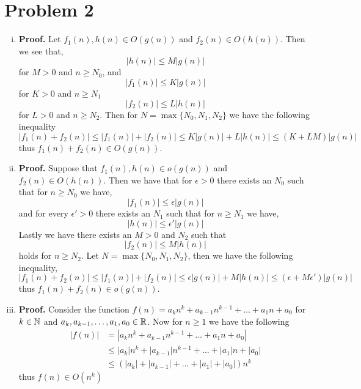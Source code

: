 \documentclass[12pt]{report}
\begin{document}
\section*{Problem 2}
\begin{enumerate}[(i)]
    \item \textbf{Proof.} Let $f_1(n), h(n) \in O(g(n))$ and $f_2(n) \in O(h(n))$. Then we see that,
    \begin{equation*}
        |h(n)| \leq M|g(n)|
    \end{equation*}
    for $M > 0$ and $n \geq N_0$, and
    \begin{equation*}
        |f_1(n)| \leq K|g(n)|
    \end{equation*}
    for $K > 0$ and $n \geq N_1$
    \begin{equation*}
        |f_2(n)| \leq L|h(n)| 
    \end{equation*}
    for $L > 0$ and $n \geq N_2$. Then for $N = \max\{N_0,N_1, N_2\}$ we have the following inequality
    \begin{equation*}
        |f_1(n) + f_2(n)| \leq |f_1(n)| + |f_2(n)| \leq K|g(n)| + L|h(n)| \leq (K+LM) |g(n)|
    \end{equation*}
    thus $f_1(n) + f_2(n) \in O(g(n))$.
    \item \textbf{Proof.} Suppose that $f_1(n), h(n) \in o(g(n))$ and $f_2(n) \in O(h(n))$. Then we have that for $\epsilon > 0$ there exists an $N_0$ such that for $n \geq N_0$ we have,
    \begin{equation*}
        |f_1(n)| \leq \epsilon|g(n)|
    \end{equation*}
    and for every $\epsilon' > 0$ there exists an $N_1$ such that for $n \geq N_1$ we have,
    \begin{equation*}
        |h(n)| \leq \epsilon'|g(n)| 
    \end{equation*}
    Lastly we have there exists an $M > 0$ and $N_2$ such that
    \begin{equation*}
        |f_2(n)| \leq M|h(n)|
    \end{equation*}
    holds for $n \geq N_2$. Let $N = \max\{N_0,N_1, N_2\}$, then we have the following inequality,
    \begin{equation*}
     |f_1(n) + f_2(n)| \leq |f_1(n)| + |f_2(n)| \leq \epsilon|g(n)| + M|h(n)| \leq (\epsilon + M\epsilon')|g(n)|
    \end{equation*}
    thus $f_1(n) + f_2(n) \in o(g(n))$.
    \item \textbf{Proof.} Consider the function $f(n) = a_kn^k + a_{k-1}n^{k-1} + \dots + a_1n + a_0$ for $k \in \mathbb{N}$ and $a_k,a_{k-1},\dots,a_1,a_0 \in \mathbb{R}$. Now for $n \geq 1$ we have the following
    \begin{align*}
        |f(n)| &= |a_kn^k + a_{k-1}n^{k-1} + \dots + a_1n + a_0| \\
        &\leq |a_k|n^k + |a_{k-1}|n^{k-1} + \dots + |a_1|n + |a_0| \\
        & \leq \left(|a_k|+ |a_{k-1}|+ \dots + |a_1| + |a_0|\right) n^k
    \end{align*}
    thus $f(n) \in O(n^k)$
\end{enumerate}
\end{document}
